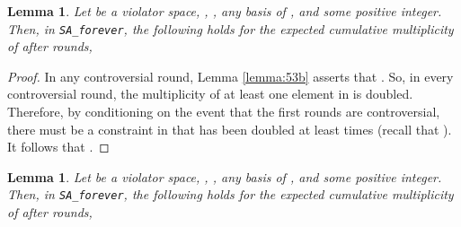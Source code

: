 \documentclass[12pt]{article}
\newtheorem{lemma2}[theorem2]{Lemma}
\newenvironment{lemma}{\begin{lemma2}}{\end{lemma2}}
\theoremstyle{remark}
\def\stageIIforever{\texttt{SA\_forever}}
\begin{document}
\begin{lemma}
\label{lemma:lowerbound}
Let  be a violator space,  , ,
 any basis of , and  some positive integer.
Then, in \stageIIforever, the following holds for the expected cumulative
multiplicity of  after  rounds,

\end{lemma}
\begin{proof}
In any controversial round,
Lemma \ref{lemma:53b} asserts that . So, in every controversial round, the 
multiplicity of at least one element in  is doubled. Therefore, by conditioning on the event
that the first  rounds are controversial,
there must be a constraint in  that has been doubled at least  times (recall that 
). It follows that 
.
\end{proof}

\begin{lemma}
\label{lemma:upperbound}
Let  be a violator space, , ,
 any basis of , and  some positive integer.
Then, in \stageIIforever, the following holds for the expected cumulative
multiplicity of  after  rounds,

\end{lemma}
\end{document}

